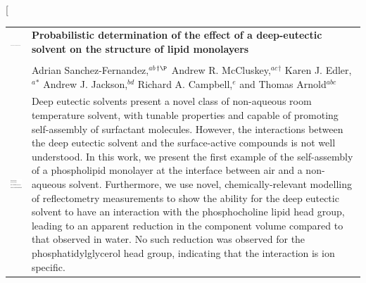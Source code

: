 \documentclass[twoside,twocolumn,9pt]{article}
\begin{document}
\twocolumn[
  \begin{@twocolumnfalse}
\vspace{3cm}
\sffamily
\begin{tabular}{m{4.5cm} p{13.5cm} }

\includegraphics{head_foot/DOI} & \noindent\LARGE{\textbf{Probabilistic determination of the effect of a deep-eutectic solvent on the structure of lipid monolayers}} \\%
\vspace{0.3cm} & \vspace{0.3cm} \\

 & \noindent\large{Adrian Sanchez-Fernandez,\textit{$^{ab}$}$^{\dag\P}$ Andrew R. McCluskey,\textit{$^{ac}$}$^{\dag}$ Karen J. Edler,\textit{$^{a}$}$^{\ast}$ Andrew J. Jackson,\textit{$^{bd}$} Richard A. Campbell,\textit{$^{e}$} and Thomas Arnold\textit{$^{abc}$}} \\%

\includegraphics{head_foot/dates} & \noindent\normalsize{Deep eutectic solvents present a novel class of non-aqueous room temperature solvent, with tunable properties and capable of promoting self-assembly of surfactant molecules. However, the interactions between the deep eutectic solvent and the surface-active compounds is not well understood. In this work, we present the first example of the self-assembly of a phospholipid monolayer at the interface between air and a non-aqueous solvent. Furthermore, we use novel, chemically-relevant modelling of reflectometry measurements to show the ability for the deep eutectic solvent to have an interaction with the phosphocholine lipid head group, leading to an apparent reduction in the component volume compared to that observed in water. No such reduction was observed for the phosphatidylglycerol head group, indicating that the interaction is ion specific.} \\

\end{tabular}

	\end{@twocolumnfalse} \vspace{0.6cm}
\end{document}
